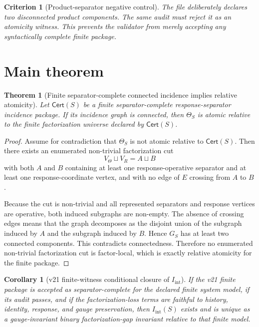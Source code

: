 \documentclass[11pt]{article}
\newtheorem{theorem}[definition]{Theorem}
\newtheorem{corollary}[definition]{Corollary}
\newtheorem{criterion}[definition]{Criterion}
\newcommand{\Iint}{I_{\mathrm{int}}}
\newcommand{\VTheta}{V_{\Theta}}
\newcommand{\VR}{V_R}
\newcommand{\Cert}{\mathsf{Cert}}
\begin{document}
\begin{criterion}[Product-separator negative control]
The file  deliberately declares two disconnected product components. The same audit must reject it as an atomicity witness. This prevents the validator from merely accepting any syntactically complete finite package.
\end{criterion}

\section{Main theorem}

\begin{theorem}[Finite separator-complete connected incidence implies relative atomicity]
Let $\Cert(S)$ be a finite separator-complete response-separator incidence package. If its incidence graph is connected, then $\Theta_S$ is atomic relative to the finite factorization universe declared by $\Cert(S)$.
\end{theorem}

\begin{proof}
Assume for contradiction that $\Theta_S$ is not atomic relative to $\Cert(S)$. Then there exists an enumerated non-trivial factorization cut
\[
  \VTheta\sqcup\VR = A\sqcup B
\]
with both $A$ and $B$ containing at least one response-operative separator and at least one response-coordinate vertex, and with no edge of $E$ crossing from $A$ to $B$.

Because the cut is non-trivial and all represented separators and response vertices are operative, both induced subgraphs are non-empty. The absence of crossing edges means that the graph decomposes as the disjoint union of the subgraph induced by $A$ and the subgraph induced by $B$. Hence $G_S$ has at least two connected components. This contradicts connectedness. Therefore no enumerated non-trivial factorization cut is factor-local, which is exactly relative atomicity for the finite package.
\end{proof}

\begin{corollary}[v21 finite-witness conditional closure of $\Iint$]
If the v21 finite package is accepted as separator-complete for the declared finite system model, if its audit passes, and if the factorization-loss terms are faithful to history, identity, response, and gauge preservation, then $\Iint(S)$ exists and is unique as a gauge-invariant binary factorization-gap invariant relative to that finite model.
\end{corollary}
\end{document}
